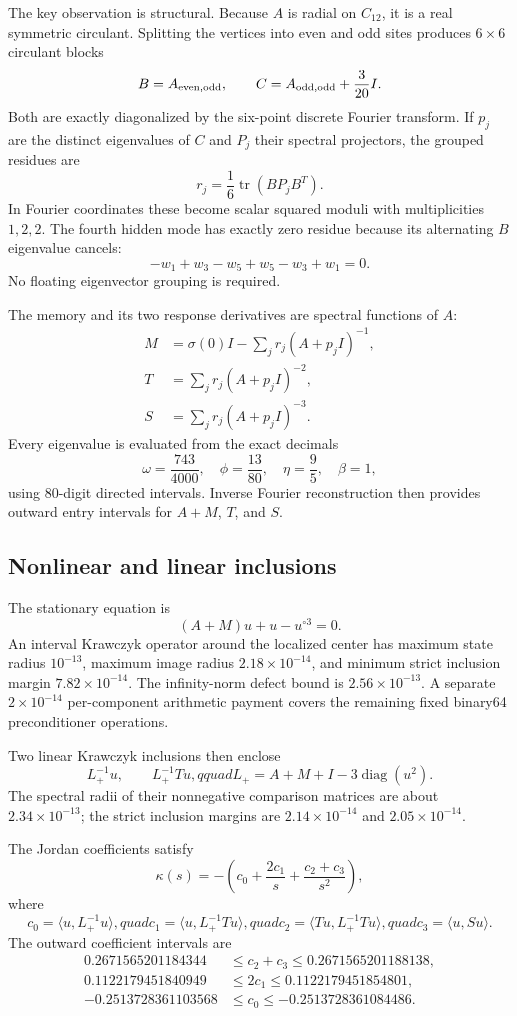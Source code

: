 \documentclass[11pt,a4paper]{article}
\begin{document}
The key observation is structural. Because $A$ is radial on $C_{12}$, it is a real symmetric circulant. Splitting the vertices into even and odd sites produces $6\times6$ circulant blocks
\[
B=A_{\rm even,odd},\qquad C=A_{\rm odd,odd}+\frac{3}{20}I.
\]
Both are exactly diagonalized by the six-point discrete Fourier transform. If $p_j$ are the distinct eigenvalues of $C$ and $P_j$ their spectral projectors, the grouped residues are
\[
r_j=\frac1{6}\operatorname{tr}(BP_jB^T).
\]
In Fourier coordinates these become scalar squared moduli with multiplicities $1,2,2$. The fourth hidden mode has exactly zero residue because its alternating $B$ eigenvalue cancels:
\[
-w_1+w_3-w_5+w_5-w_3+w_1=0.
\]
No floating eigenvector grouping is required.

The memory and its two response derivatives are spectral functions of $A$:
\begin{align*}
M&=\sigma(0)I-\sum_jr_j(A+p_jI)^{-1},\\
T&=\sum_jr_j(A+p_jI)^{-2},\\
S&=\sum_jr_j(A+p_jI)^{-3}.
\end{align*}
Every eigenvalue is evaluated from the exact decimals
\[
\omega=\frac{743}{4000},\quad \phi=\frac{13}{80},\quad
\eta=\frac95,\quad \beta=1,
\]
using 80-digit directed intervals. Inverse Fourier reconstruction then provides outward entry intervals for $A+M$, $T$, and $S$.

\subsection{Nonlinear and linear inclusions}

The stationary equation is
\[
(A+M)u+u-u^{\circ3}=0.
\]
An interval Krawczyk operator around the localized center has maximum state radius $10^{-13}$, maximum image radius $2.18\times10^{-14}$, and minimum strict inclusion margin $7.82\times10^{-14}$. The infinity-norm defect bound is $2.56\times10^{-13}$. A separate $2\times10^{-14}$ per-component arithmetic payment covers the remaining fixed binary64 preconditioner operations.

Two linear Krawczyk inclusions then enclose
\[
L_+^{-1}u,\qquad L_+^{-1}Tu,qquad
L_+=A+M+I-3\operatorname{diag}(u^2).
\]
The spectral radii of their nonnegative comparison matrices are about $2.34\times10^{-13}$; the strict inclusion margins are $2.14\times10^{-14}$ and $2.05\times10^{-14}$.

The Jordan coefficients satisfy
\[
\kappa(s)=-\left(c_0+\frac{2c_1}{s}+\frac{c_2+c_3}{s^2}\right),
\]
where
\[
c_0=\langle u,L_+^{-1}u\rangle,quad
c_1=\langle u,L_+^{-1}Tu\rangle,quad
c_2=\langle Tu,L_+^{-1}Tu\rangle,quad
c_3=\langle u,Su\rangle.
\]
The outward coefficient intervals are
\begin{align*}
0.2671565201184344&\le c_2+c_3\le0.2671565201188138,\\
0.1122179451840949&\le2c_1\le0.1122179451854801,\\
-0.2513728361103568&\le c_0\le-0.2513728361084486.
\end{align*}
\end{document}
